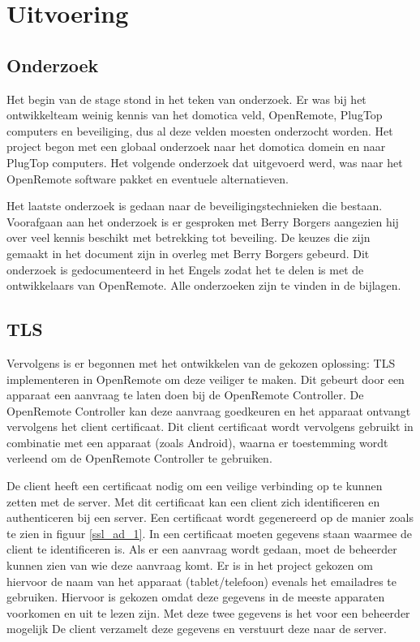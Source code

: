 \documentclass[]{article}
\begin{document}
\section{Uitvoering}

\subsection{Onderzoek}

Het begin van de stage stond in het teken van onderzoek. Er was bij het
ontwikkelteam weinig kennis van het domotica veld, OpenRemote, PlugTop computers
en beveiliging, dus al deze velden moesten onderzocht worden. Het project begon
met een globaal onderzoek naar het domotica domein en naar PlugTop computers. Het
volgende onderzoek dat uitgevoerd werd, was naar het OpenRemote software pakket en
eventuele alternatieven.

Het laatste onderzoek is gedaan naar de beveiligingstechnieken die bestaan.
Voorafgaan aan het onderzoek is er gesproken met Berry Borgers
aangezien hij over veel kennis beschikt met betrekking tot beveiling. De keuzes
die zijn gemaakt in het document zijn in overleg met Berry Borgers gebeurd. Dit
onderzoek is gedocumenteerd in het Engels zodat het te delen is met de
ontwikkelaars van OpenRemote. Alle onderzoeken zijn  te vinden in de bijlagen.

\subsection{TLS}
Vervolgens is er begonnen met het ontwikkelen van de gekozen oplossing:
TLS implementeren in OpenRemote om deze veiliger te maken. Dit gebeurt
door een apparaat een aanvraag te laten doen bij de OpenRemote Controller. De
OpenRemote Controller kan deze aanvraag goedkeuren en het apparaat ontvangt
vervolgens het client certificaat. Dit client certificaat wordt vervolgens
gebruikt in combinatie met een apparaat (zoals Android), waarna er toestemming
wordt verleend om de OpenRemote Controller te gebruiken.

De client heeft een certificaat nodig om een veilige verbinding op te kunnen
zetten met de server. Met dit certificaat kan een client zich identificeren en
authenticeren bij een server. Een certificaat wordt gegenereerd op de manier
zoals te zien in figuur \ref{ssl_ad_1}. In een certificaat moeten gegevens staan
waarmee de client te identificeren is. Als er een aanvraag wordt gedaan, moet de
beheerder kunnen zien van wie deze aanvraag komt. Er is in het project gekozen
om hiervoor de naam van het apparaat (tablet/telefoon) evenals het emailadres te
gebruiken. Hiervoor is gekozen omdat deze gegevens in de meeste apparaten
voorkomen en uit te lezen zijn. Met deze twee gegevens is het voor een beheerder
mogelijk  De client verzamelt deze gegevens en verstuurt deze naar de server. 
\end{document}
